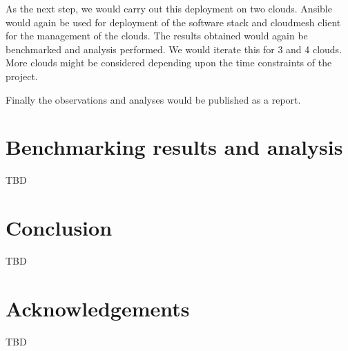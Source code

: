 \documentclass[9pt,twocolumn,twoside]{styles/osajnl}
\begin{document}
As the next step, we would carry out this deployment on two clouds.
Ansible would again be used for deployment of the software stack and
cloudmesh client for the management of the clouds.  The results
obtained would again be benchmarked and analysis performed.  We would
iterate this for 3 and 4 clouds.  More clouds might be considered
depending upon the time constraints of the project.

Finally the observations and analyses would be published as a report.

\section{Benchmarking results and analysis}
TBD

\section{Conclusion}
TBD

\section{Acknowledgements}
TBD


\end{document}
